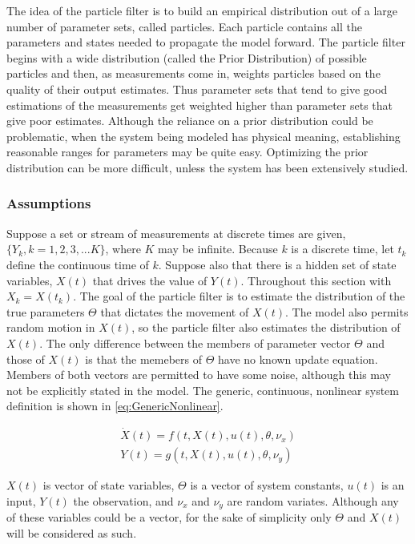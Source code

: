 \documentclass[journal]{./IEEEtran}
\begin{document}
The idea of the particle filter is to build an empirical distribution
out of a large number of parameter sets, called particles. Each
particle contains all the parameters and states needed to propagate
the model forward.  The particle filter begins with a wide distribution 
(called the Prior Distribution)
of possible particles and then, as measurements come in, weights 
particles based on the quality of their output estimates. Thus parameter sets 
that tend to give good estimations of the measurements get weighted higher
than parameter sets that give poor estimates. Although the reliance on
a prior distribution could be problematic, when the system being modeled
has physical meaning, establishing reasonable ranges for parameters may be 
quite easy. Optimizing the prior distribution can be more difficult,
unless the system has been extensively studied.

\subsubsection{Assumptions}
Suppose a set or stream of measurements at discrete times are given, 
$\{Y_k, k = 1, 2, 3, ... K\}$, where $K$ may be infinite. 
Because $k$ is a discrete time, let $t_k$ define the continuous
time of $k$.
Suppose also that there is a hidden set of state variables,
$X(t)$ that drives the value of $Y(t)$. Throughout this section
with $X_k = X(t_k)$. The goal of the particle filter is to estimate the 
distribution of the
true parameters $\Theta$ that dictates the movement of $X(t)$.
The model also permits random motion in $X(t)$, so the 
particle filter also estimates the distribution of $X(t)$.
The only difference between the members of parameter vector
$\Theta$ and those of $X(t)$ is that the memebers of
$\Theta$ have no known update equation. Members of both vectors
are permitted to have some noise, although this
may not be explicitly stated in the model. The generic, continuous, nonlinear
system definition is shown in \autoref{eq:GenericNonlinear}.

\begin{eqnarray}
\dot{X}(t) = f(t, X(t), u(t), \theta, \nu_x) \nonumber \\
Y(t) = g(t, X(t), u(t), \theta, \nu_y)
\label{eq:GenericNonlinear}
\end{eqnarray}

$X(t)$ is vector of state variables, $\Theta$ is a vector of system
constants, $u(t)$ is an input, $Y(t)$ the observation, and
$\nu_x$ and $\nu_y$ are random variates. Although any of these
variables could be a vector, for the sake of simplicity only
$\Theta$ and $X(t)$ will be considered as such. 
\end{document}
